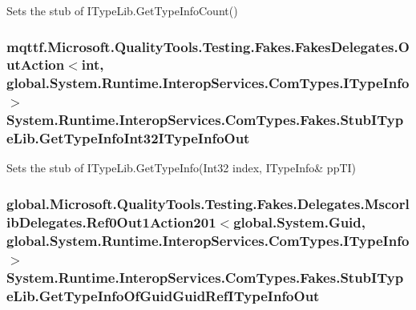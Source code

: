 Sets the stub of I\-Type\-Lib.\-Get\-Type\-Info\-Count()

\hypertarget{class_system_1_1_runtime_1_1_interop_services_1_1_com_types_1_1_fakes_1_1_stub_i_type_lib_a2a4dac5a32352e2406b23bf32e3e697f}{
\subsubsection[{Get\-Type\-Info\-Int32\-I\-Type\-Info\-Out}]{\setlength{\rightskip}{0pt plus 5cm}mqttf.\-Microsoft.\-Quality\-Tools.\-Testing.\-Fakes.\-Fakes\-Delegates.\-Out\-Action$<$int, global.\-System.\-Runtime.\-Interop\-Services.\-Com\-Types.\-I\-Type\-Info$>$ System.\-Runtime.\-Interop\-Services.\-Com\-Types.\-Fakes.\-Stub\-I\-Type\-Lib.\-Get\-Type\-Info\-Int32\-I\-Type\-Info\-Out}}\label{class_system_1_1_runtime_1_1_interop_services_1_1_com_types_1_1_fakes_1_1_stub_i_type_lib_a2a4dac5a32352e2406b23bf32e3e697f}


Sets the stub of I\-Type\-Lib.\-Get\-Type\-Info(Int32 index, I\-Type\-Info\& pp\-T\-I)

\hypertarget{class_system_1_1_runtime_1_1_interop_services_1_1_com_types_1_1_fakes_1_1_stub_i_type_lib_a04b019f502a0d97ff58a323999456ccd}{
\subsubsection[{Get\-Type\-Info\-Of\-Guid\-Guid\-Ref\-I\-Type\-Info\-Out}]{\setlength{\rightskip}{0pt plus 5cm}global.\-Microsoft.\-Quality\-Tools.\-Testing.\-Fakes.\-Delegates.\-Mscorlib\-Delegates.\-Ref0\-Out1\-Action201$<$global.\-System.\-Guid, global.\-System.\-Runtime.\-Interop\-Services.\-Com\-Types.\-I\-Type\-Info$>$ System.\-Runtime.\-Interop\-Services.\-Com\-Types.\-Fakes.\-Stub\-I\-Type\-Lib.\-Get\-Type\-Info\-Of\-Guid\-Guid\-Ref\-I\-Type\-Info\-Out}}\label{class_system_1_1_runtime_1_1_interop_services_1_1_com_types_1_1_fakes_1_1_stub_i_type_lib_a04b019f502a0d97ff58a323999456ccd}


